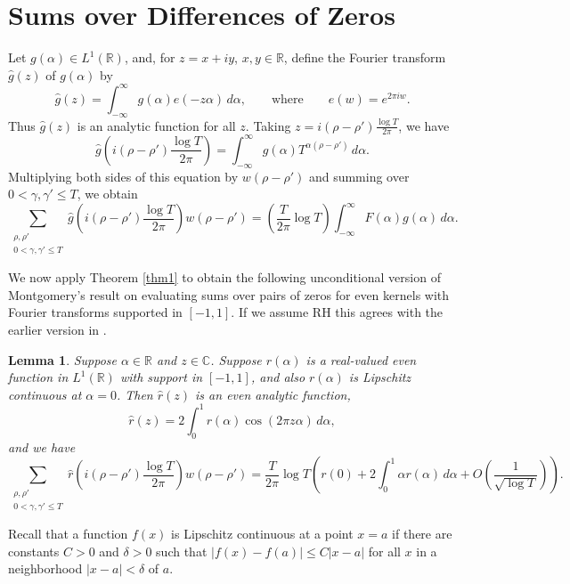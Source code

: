 \documentclass{amsart}
\newcommand{\1}{\mathbbm{1}}
\newtheorem{lem}{Lemma}
\theoremstyle{remark}
\numberwithin{equation}{section}
\begin{document}
\section{Sums over Differences of Zeros}

Let $g(\alpha)\in L^{\!1}(\mathbb R)$, and, for $z=x+iy$, $x,y \in \mathbb{R}$, define the Fourier transform $\widehat{g}(z)$ of $g(\alpha)$ by
\begin{equation}\label{hat-g}
\widehat{g}(z) = \int_{-\infty}^\infty g(\alpha)e(-z\alpha)\,d\alpha, \qquad \text{where} \qquad e(w) = e^{2\pi i w}.
\end{equation}
Thus $\widehat{g}(z)$ is an analytic function for all $z$. 
Taking $z= i(\rho-\rho')\frac{\log T}{2\pi}$, we have 
\[ \widehat{g}\left( i(\rho-\rho')\frac{\log T}{2\pi}\right) = \int_{-\infty}^\infty g(\alpha)T^{\alpha(\rho -\rho')}\,d\alpha.
\]
Multiplying both sides of this equation by $w(\rho-\rho')$ and summing over $0<\gamma, \gamma' \le T$, we obtain
\begin{equation}\label{pairsum}
\sum_{\substack{\rho, \rho' \\ 0<\gamma,\gamma'\le T}} \widehat{g}\left(i(\rho -\rho')\frac{\log T}{2\pi}\right) w(\rho-\rho') 
= \left(\frac{T}{2\pi}\log T\right)\int_{-\infty}^\infty F(\alpha)g(\alpha)\,d\alpha.
\end{equation}

We now apply Theorem \ref{thm1} to obtain the following unconditional version of Montgomery's result on evaluating sums over pairs of zeros for even kernels with Fourier transforms supported in $[-1,1]$. If we assume RH this agrees with the earlier version in \cite{Montgomery73}. 

\begin{lem}\label{lem5} Suppose $ \alpha \in \mathbb{R}$ and $z\in \mathbb{C}$. Suppose $r(\alpha)$
is a real-valued even function in $L^{\!1}(\mathbb R)$ with support in $[-1,1]$, and also $r(\alpha)$ is Lipschitz continuous at $\alpha =0$. Then $\widehat r(z)$ is an even analytic function,
\begin{equation}\label{rhateven}
\widehat{r}(z) = 2\int_{0}^1 r(\alpha) \cos(2 \pi z\alpha)\,d\alpha, \end{equation}
and we have
\begin{equation}\label{lem5eq}
\sum_{\substack{\rho, \rho' \\ 0<\gamma,\gamma'\le T}} \widehat{r}\left(i(\rho -\rho')\frac{\log T}{2\pi}\right) w(\rho-\rho') = \frac{T}{2\pi}\log T
\left(r(0) + 2\int_{0}^1 \alpha r(\alpha)\,d\alpha+O\left(\frac1{\sqrt{\log T}}\right)\right).
\end{equation}
\end{lem}
Recall that a function $f(x)$ is Lipschitz continuous at a point $x=a$ if there are constants $C>0$ and $\delta >0$ such that $|f(x)-f(a)| \le C |x-a|$ for all $x$ in a neighborhood $|x-a|< \delta$ of $a$. 
\end{document}
